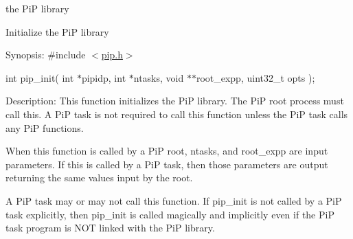 the Pi\-P library

Initialize the Pi\-P library

\begin{DoxyParagraph}{Synopsis\-:}
\#include $<$\hyperlink{pip_8h_source}{pip.\-h}$>$ \par
int pip\-\_\-init( int $\ast$pipidp, int $\ast$ntasks, void $\ast$$\ast$root\-\_\-expp, uint32\-\_\-t opts );
\end{DoxyParagraph}
\begin{DoxyParagraph}{Description\-:}
This function initializes the Pi\-P library. The Pi\-P root process must call this. A Pi\-P task is not required to call this function unless the Pi\-P task calls any Pi\-P functions. 
\end{DoxyParagraph}
\begin{DoxyParagraph}{}
When this function is called by a Pi\-P root, {\ttfamily ntasks}, and {\ttfamily root\-\_\-expp} are input parameters. If this is called by a Pi\-P task, then those parameters are output returning the same values input by the root. 
\end{DoxyParagraph}
\begin{DoxyParagraph}{}
A Pi\-P task may or may not call this function. If {\ttfamily pip\-\_\-init} is not called by a Pi\-P task explicitly, then {\ttfamily pip\-\_\-init} is called magically and implicitly even if the Pi\-P task program is N\-O\-T linked with the Pi\-P library.
\end{DoxyParagraph}

